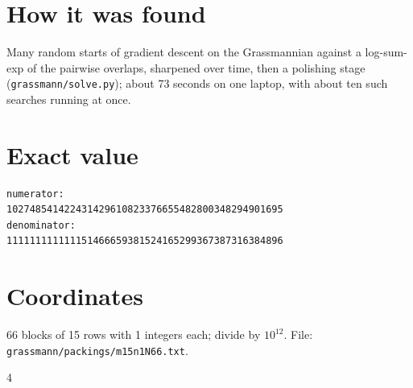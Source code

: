 \documentclass[11pt,a4paper]{article}
\begin{document}
\section{How it was found}
Many random starts of gradient descent on the Grassmannian against a log-sum-exp of the pairwise overlaps, sharpened over time, then a polishing stage (\texttt{grassmann/solve.py}); about 73 seconds on one laptop, with about ten such searches running at once.


\appendix
\section{Exact value}
{\small
\begin{verbatim}
numerator:
102748541422431429610823376655482800348294901695
denominator:
111111111111151466659381524165299367387316384896
\end{verbatim}}

\section{Coordinates}
66 blocks of 15 rows with 1 integers each; divide by $10^{12}$. File: \texttt{grassmann/packings/m15n1N66.txt}.
{\tiny
\begin{multicols}{4}
\end{multicols}}
\end{document}
